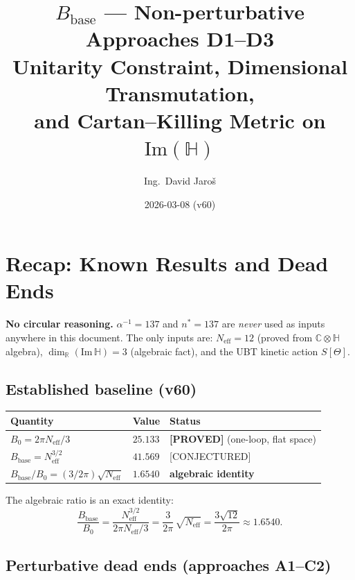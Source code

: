 \documentclass[11pt,a4paper]{article}
\title{$B_{\mathrm{base}}$ — Non-perturbative Approaches D1--D3\\
    \large Unitarity Constraint, Dimensional Transmutation,\\
    \large and Cartan--Killing Metric on $\mathrm{Im}(\mathbb{H})$}
\author{Ing.\ David Jaroš}
\date{2026-03-08 (v60)}
\theoremstyle{definition}
\theoremstyle{remark}
\begin{document}
  \maketitle
\fi

\section{Recap: Known Results and Dead Ends}
\label{sec:recap}

\noindent\textbf{No circular reasoning.}
$\alpha^{-1} = 137$ and $n^* = 137$ are \emph{never} used as inputs anywhere
in this document.
The only inputs are: $N_{\mathrm{eff}} = 12$ (proved from $\mathbb{C}\otimes\mathbb{H}$
algebra), $\dim_\mathbb{R}(\mathrm{Im}\,\mathbb{H}) = 3$ (algebraic fact), and
the UBT kinetic action $S[\Theta]$.

\subsection{Established baseline (v60)}

\begin{center}
\begin{tabular}{lll}
  \hline
  Quantity & Value & Status \\
  \hline
  $B_0 = 2\pi N_{\mathrm{eff}}/3$ & $25.133$ & \textbf{[PROVED]} (one-loop, flat space) \\
  $B_{\mathrm{base}} = N_{\mathrm{eff}}^{3/2}$ & $41.569$ & [CONJECTURED] \\
  $B_{\mathrm{base}}/B_0 = (3/2\pi)\sqrt{N_{\mathrm{eff}}}$ & $1.6540$ & \textbf{algebraic identity} \\
  \hline
\end{tabular}
\end{center}

The algebraic ratio is an exact identity:
\begin{equation}
  \frac{B_{\mathrm{base}}}{B_0}
    = \frac{N_{\mathrm{eff}}^{3/2}}{2\pi N_{\mathrm{eff}}/3}
    = \frac{3}{2\pi}\,\sqrt{N_{\mathrm{eff}}}
    = \frac{3\sqrt{12}}{2\pi}
    \approx 1.6540.
  \label{eq:ratio_identity}
\end{equation}

\subsection{Perturbative dead ends (approaches A1--C2)}
\end{document}
